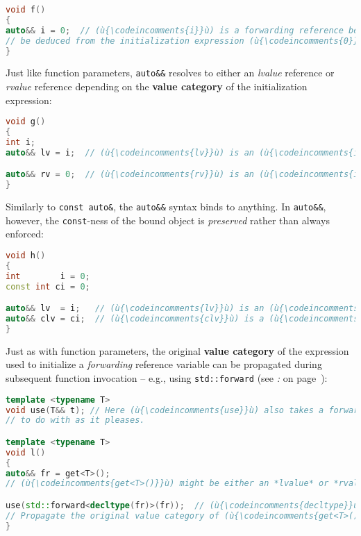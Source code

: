 \begin{lstlisting}[language=C++]
void f()
{
auto&& i = 0;  // (ù{\codeincomments{i}}ù) is a forwarding reference because the type of (ù{\codeincomments{i}}ù) must
// be deduced from the initialization expression (ù{\codeincomments{0}}ù).
}
\end{lstlisting}

\noindent Just like function parameters, \texttt{auto\&\&} resolves to either an
\emph{lvalue} reference or \emph{rvalue} reference depending on the
\textbf{value category} of the initialization expression:

\begin{lstlisting}[language=C++]
void g()
{
int i;
auto&& lv = i;  // (ù{\codeincomments{lv}}ù) is an (ù{\codeincomments{int\&}}ù).

auto&& rv = 0;  // (ù{\codeincomments{rv}}ù) is an (ù{\codeincomments{int\&\&}}ù).
}
\end{lstlisting}

\noindent Similarly to \texttt{const}~\texttt{auto\&}, the \texttt{auto\&\&}
syntax binds to anything. In \texttt{auto\&\&}, however, the
\texttt{const}-ness of the bound object is \emph{preserved} rather than
always enforced:

\begin{lstlisting}[language=C++]
void h()
{
int        i = 0;
const int ci = 0;

auto&& lv  = i;   // (ù{\codeincomments{lv}}ù) is an (ù{\codeincomments{int\&}}ù).
auto&& clv = ci;  // (ù{\codeincomments{clv}}ù) is a (ù{\codeincomments{const int\&}}ù).
}
\end{lstlisting}

\noindent Just as with function parameters, the original \textbf{value category}
of the expression used to initialize a \emph{forwarding} reference
variable can be propagated during subsequent function invocation --
e.g., using \texttt{std::forward} (see \textit{: } on page~\pageref{the-std::forward-utility}):

\begin{lstlisting}[language=C++]
template <typename T>
void use(T&& t); // Here (ù{\codeincomments{use}}ù) also takes a forwarding reference parameter
// to do with as it pleases.

template <typename T>
void l()
{
auto&& fr = get<T>();
// (ù{\codeincomments{get<T>()}}ù) might be either an *lvalue* or *rvalue* depending on (ù{\codeincomments{T}}ù).

use(std::forward<decltype(fr)>(fr));  // (ù{\codeincomments{decltype}}ù) is a C++11 feature.
// Propagate the original value category of (ù{\codeincomments{get<T>()}}ù) into (ù{\codeincomments{use}}ù).
}
\end{lstlisting}

